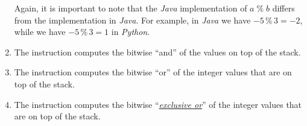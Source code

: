 \begin{enumerate}
      Again, it is important to note that the \textsl{Java} implementation of $a \;\texttt{\%}\; b$
      differs from the implementation in \textsl{Java}.  For example, in \textsl{Java} we have
      $-5 \,\mathtt{\%}\, 3 = -2$,
      while we have $-5 \,\mathtt{\%}\, 3 = 1$
      in \textsl{Python}.
\item The instruction 
      computes the bitwise ``and'' of the values on top of the stack.
\item The instruction 
      computes the bitwise ``or'' of the integer values that are on top of the stack.
\item The instruction 
      computes the bitwise ``\href{http://en.wikipedia.org/wiki/Exclusive_or}{\emph{exclusive or}}'' of
      the integer values that are on top of the stack. 
\end{enumerate}

